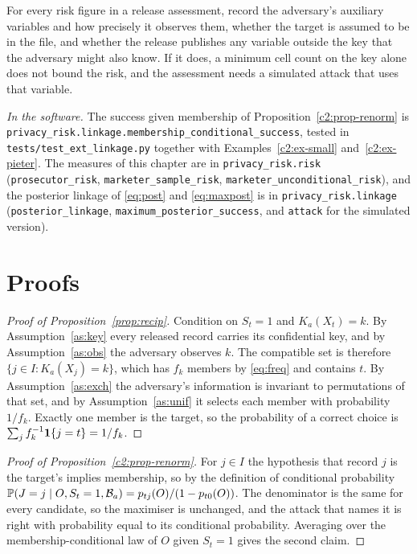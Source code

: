 \begin{inpractice}
For every risk figure in a release assessment, record the adversary's auxiliary
variables and how precisely it observes them, whether the target is assumed to be
in the file, and whether the release publishes any variable outside the key that the
adversary might also know. If it does, a minimum cell count on the key alone does
not bound the risk, and the assessment needs a simulated attack that uses that
variable.

\smallskip\noindent\textit{In the software.} The success given membership of Proposition~\ref{c2:prop-renorm} is \texttt{privacy\_risk.linkage.membership\_conditional\_success}, tested in \texttt{tests/test\_ext\_linkage.py} together with Examples~\ref{c2:ex-small} and~\ref{c2:ex-pieter}. The measures of this chapter are in
\texttt{privacy\_risk.risk} (\texttt{prosecutor\_risk},
\texttt{marketer\_sample\_risk}, \texttt{marketer\_unconditional\_risk}), and the
posterior linkage of \eqref{eq:post} and \eqref{eq:maxpost} is in
\texttt{privacy\_risk.linkage} (\texttt{posterior\_linkage},
\texttt{maximum\_posterior\_success}, and \texttt{attack} for the simulated
version).
\end{inpractice}

\section{Proofs}

\begin{proof}[Proof of Proposition~\ref{prop:recip}]
Condition on $S_t = 1$ and $K_a(X_t) = k$. By Assumption~\ref{as:key} every
released record carries its confidential key, and by Assumption~\ref{as:obs} the
adversary observes $k$. The compatible set is therefore
$\{j \in I : K_a(X_j) = k\}$, which has $f_k$ members by \eqref{eq:freq} and
contains $t$. By Assumption~\ref{as:exch} the adversary's information is invariant
to permutations of that set, and by Assumption~\ref{as:unif} it selects each member
with probability $1/f_k$. Exactly one member is the target, so the probability of
a correct choice is $\sum_{j} f_k^{-1}\mathbf{1}\{j = t\} = 1/f_k$.
\end{proof}

\begin{proof}[Proof of Proposition~\ref{c2:prop-renorm}]
For $j\in I$ the hypothesis that record $j$ is the target's implies membership, so by the definition of conditional probability $\mathbb{P}(J=j\mid O,S_t=1,\mathcal B_a)=p_{tj}(O)/(1-p_{t0}(O))$. The denominator is the same for every candidate, so the maximiser is unchanged, and the attack that names it is right with probability equal to its conditional probability. Averaging over the membership-conditional law of $O$ given $S_t=1$ gives the second claim.
\end{proof}

